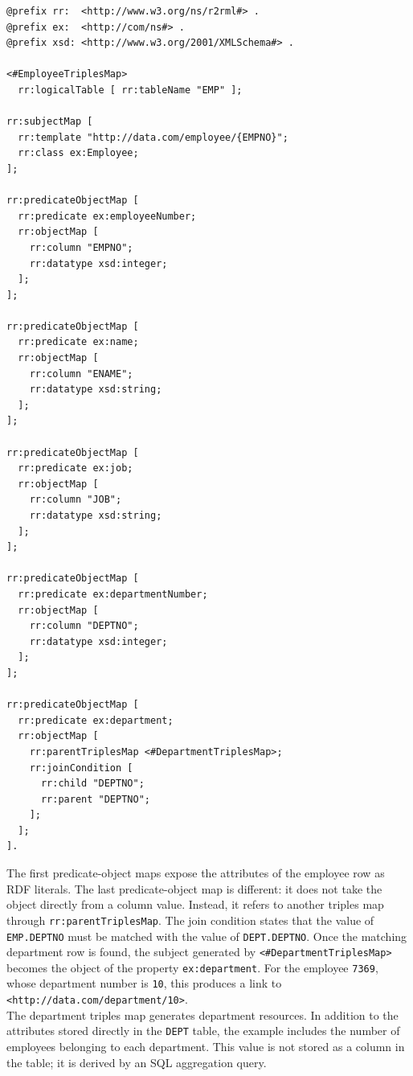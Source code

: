 \documentclass{scrbook}
\begin{document}
	\begin{lstlisting}
@prefix rr:  <http://www.w3.org/ns/r2rml#> .
@prefix ex:  <http://com/ns#> .
@prefix xsd: <http://www.w3.org/2001/XMLSchema#> .

<#EmployeeTriplesMap>
  rr:logicalTable [ rr:tableName "EMP" ];
		
rr:subjectMap [
  rr:template "http://data.com/employee/{EMPNO}";
  rr:class ex:Employee;
];
		
rr:predicateObjectMap [
  rr:predicate ex:employeeNumber;
  rr:objectMap [
    rr:column "EMPNO";
    rr:datatype xsd:integer;
  ];
];

rr:predicateObjectMap [
  rr:predicate ex:name;
  rr:objectMap [
    rr:column "ENAME";
    rr:datatype xsd:string;
  ];
];

rr:predicateObjectMap [
  rr:predicate ex:job;
  rr:objectMap [
    rr:column "JOB";
    rr:datatype xsd:string;
  ];
];

rr:predicateObjectMap [
  rr:predicate ex:departmentNumber;
  rr:objectMap [
    rr:column "DEPTNO";
    rr:datatype xsd:integer;
  ];
];

rr:predicateObjectMap [
  rr:predicate ex:department;
  rr:objectMap [
    rr:parentTriplesMap <#DepartmentTriplesMap>;
    rr:joinCondition [
      rr:child "DEPTNO";
      rr:parent "DEPTNO";
    ];
  ];
].
	\end{lstlisting}
	
	The first predicate-object maps expose the attributes of the employee row as RDF literals. The last predicate-object map is different: it does not take the object directly from a column value. Instead, it refers to another triples map through \texttt{rr:parentTriplesMap}. The join condition states that the value of \texttt{EMP.DEPTNO} must be matched with the value of \texttt{DEPT.DEPTNO}. Once the matching department row is found, the subject generated by \texttt{<\#DepartmentTriplesMap>} becomes the object of the property \texttt{ex:department}. For the employee \texttt{7369}, whose department number is \texttt{10}, this produces a link to \texttt{<http://data.com/department/10>}.\\
	
	The department triples map generates department resources. In addition to the attributes stored directly in the \texttt{DEPT} table, the example includes the number of employees belonging to each department. This value is not stored as a column in the table; it is derived by an SQL aggregation query.
	
\end{document}

